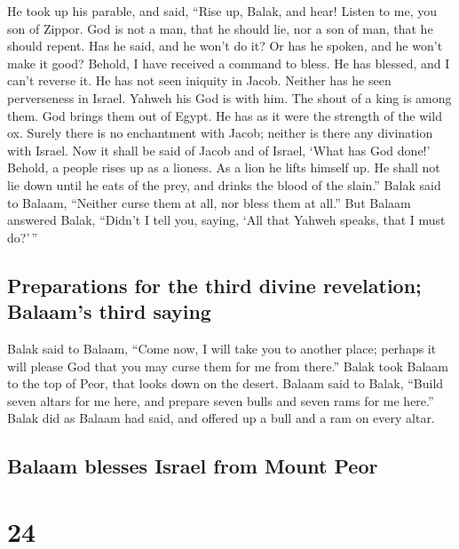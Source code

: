  He took up his parable, and said, ``Rise up, Balak, and
hear! Listen to me, you son of Zippor.  God is not a man,
that he should lie, nor a son of man, that he should repent. Has he
said, and he won't do it? Or has he spoken, and he won't make it good?
 Behold, I have received a command to bless. He has
blessed, and I can't reverse it.  He has not seen
iniquity in Jacob. Neither has he seen perverseness in Israel. Yahweh
his God is with him. The shout of a king is among them. 
God brings them out of Egypt. He has as it were the strength of the wild
ox.  Surely there is no enchantment with Jacob; neither
is there any divination with Israel. Now it shall be said of Jacob and
of Israel, `What has God done!'  Behold, a people rises
up as a lioness. As a lion he lifts himself up. He shall not lie down
until he eats of the prey, and drinks the blood of the slain.''
 Balak said to Balaam, ``Neither curse them at all, nor
bless them at all.''  But Balaam answered Balak, ``Didn't
I tell you, saying, `All that Yahweh speaks, that I must do?'\,''

\hypertarget{preparations-for-the-third-divine-revelation-balaams-third-saying}{%
\subsection{Preparations for the third divine revelation; Balaam's third
saying}\label{preparations-for-the-third-divine-revelation-balaams-third-saying}}

 Balak said to Balaam, ``Come now, I will take you to
another place; perhaps it will please God that you may curse them for me
from there.''  Balak took Balaam to the top of Peor, that
looks down on the desert.  Balaam said to Balak, ``Build
seven altars for me here, and prepare seven bulls and seven rams for me
here.''  Balak did as Balaam had said, and offered up a
bull and a ram on every altar.

\hypertarget{balaam-blesses-israel-from-mount-peor}{%
\subsection{Balaam blesses Israel from Mount
Peor}\label{balaam-blesses-israel-from-mount-peor}}

\hypertarget{section-23}{%
\section{24}\label{section-23}}

